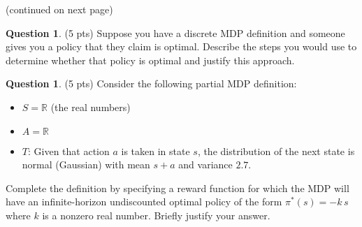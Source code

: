 \documentclass{article}
\theoremstyle{definition}
\newtheorem{question}[thm]{Question}
\begin{document}
(continued on next page) \pagebreak

\begin{question} (5 pts)
    Suppose you have a discrete MDP definition and someone gives you a policy that they claim is optimal. Describe the steps you would use to determine whether that policy is optimal and justify this approach.
\end{question}

\begin{question} (5 pts)
    Consider the following partial MDP definition:
    \begin{itemize}[noitemsep]
        \item $S = \mathbb{R}$ (the real numbers)
        \item $A = \mathbb{R}$
        \item $T$: Given that action $a$ is taken in state $s$, the distribution of the next state is normal (Gaussian) with mean $s+a$ and variance $2.7$.
    \end{itemize}
    Complete the definition by specifying a reward function for which the MDP will have an infinite-horizon undiscounted optimal policy of the form $\pi^*(s) = -k\,s$ where $k$ is a nonzero real number. Briefly justify your answer.
\end{question}



\end{document}
